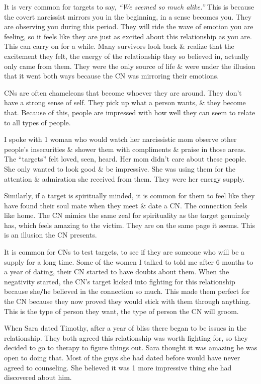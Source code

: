 \documentclass{article}
\numberwithin{equation}{section}
\begin{document}
It is very common for targets to say, \textit{``We seemed so much alike.''} This is because the covert narcissist mirrors you in the beginning, in a sense becomes you. They are observing you during this period. They will ride the wave of emotion you are feeling, so it feels like they are just as excited about this relationship as you are. This can carry on for a while. Many survivors look back \& realize that the excitement they felt, the energy of the relationship they so believed in, actually only came from them. They were the only source of life \& were under the illusion that it went both ways because the CN was mirroring their emotions.

CNs are often chameleons that become whoever they are around. They don't have a strong sense of self. They pick up what a person wants, \& they become that. Because of this, people are impressed with how well they can seem to relate to all types of people.

I spoke with 1 woman who would watch her narcissistic mom observe other people's insecurities \& shower them with compliments \& praise in those areas. The ``targets'' felt loved, seen, heard. Her mom didn't care about these people. She only wanted to look good \& be impressive. She was using them for the attention \& admiration she received from them. They were her energy supply.

Similarly, if a target is spiritually minded, it is common for them to feel like they have found their soul mate when they meet \& date a CN. The connection feels like home. The CN mimics the same zeal for spirituality as the target genuinely has, which feels amazing to the victim. They are on the same page it seems. This is an illusion the CN presents.

It is common for CNs to test targets, to see if they are someone who will be a supply for a long time. Some of the women I talked to told me after 6 months to a year of dating, their CN started to have doubts about them. When the negativity started, the CN's target kicked into fighting for this relationship because she\texttt{/}he believed in the connection so much. This made them perfect for the CN because they now proved they would stick with them through anything. This is the type of person they want, the type of person the CN will groom.

When Sara dated Timothy, after a year of bliss there began to be issues in the relationship. They both agreed this relationship was worth fighting for, so they decided to go to therapy to figure things out. Sara thought it was amazing he was open to doing that. Most of the guys she had dated before would have never agreed to counseling. She believed it was 1 more impressive thing she had discovered about him.
\end{document}
